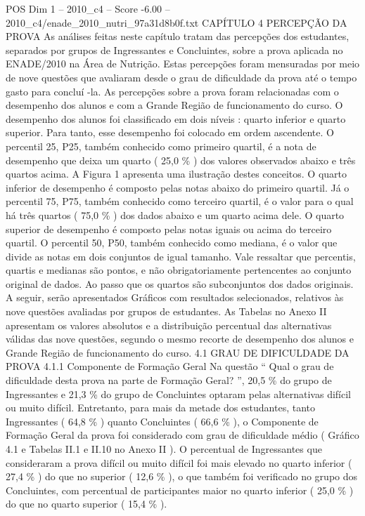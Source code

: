 \begin{textsample}{POS Dim 1 – 2010\_c4 – Score -6.00 – 2010\_c4/enade\_2010\_nutri\_97a31d8b0f.txt}  \label{ex:f1_pos_406}
CAPÍTULO 4 PERCEPÇÃO DA PROVA As análises feitas neste capítulo tratam das percepções dos estudantes, separados por grupos de Ingressantes e Concluintes, sobre a prova aplicada no ENADE/2010 na Área de Nutrição.
Estas percepções foram mensuradas por meio de nove questões que avaliaram desde o grau de dificuldade da prova até o tempo gasto para concluí -la.
As percepções sobre a prova foram relacionadas com o desempenho dos alunos e com a Grande Região de funcionamento do curso.
O desempenho dos alunos foi classificado em dois níveis : quarto inferior e quarto superior.
Para tanto, esse desempenho foi colocado em ordem ascendente.
O percentil 25, P25, também conhecido como primeiro quartil, é a nota de desempenho que deixa um quarto ( 25,0 \% ) dos valores observados abaixo e três quartos acima.
A Figura 1 apresenta uma ilustração destes conceitos.
O quarto inferior de desempenho é composto pelas notas abaixo do primeiro quartil.
Já o percentil 75, P75, também conhecido como terceiro quartil, é o valor para o qual há três quartos ( 75,0 \% ) dos dados abaixo e um quarto acima dele.
O quarto superior de desempenho é composto pelas notas iguais ou acima do terceiro quartil.
O percentil 50, P50, também conhecido como mediana, é o valor que divide as notas em dois conjuntos de igual tamanho.
Vale ressaltar que percentis, quartis e medianas são pontos, e não obrigatoriamente pertencentes ao conjunto original de dados.
Ao passo que os quartos são subconjuntos dos dados originais.
A seguir, serão apresentados Gráficos com resultados selecionados, relativos às nove questões avaliadas por grupos de estudantes.
As Tabelas no Anexo II apresentam os valores absolutos e a distribuição percentual das alternativas válidas das nove questões, segundo o mesmo recorte de desempenho dos alunos e Grande Região de funcionamento do curso. 4.1 GRAU DE DIFICULDADE DA PROVA 4.1.1 Componente de Formação Geral Na questão “ Qual o grau de dificuldade desta prova na parte de Formação Geral? ”, 20,5 \% do grupo de Ingressantes e 21,3 \% do grupo de Concluintes optaram pelas alternativas difícil ou muito difícil.
Entretanto, para mais da metade dos estudantes, tanto Ingressantes ( 64,8 \% ) quanto Concluintes ( 66,6 \% ), o Componente de Formação Geral da prova foi considerado com grau de dificuldade médio ( Gráfico 4.1 e Tabelas II.1 e II.10 no Anexo II ).
O percentual de Ingressantes que consideraram a prova difícil ou muito difícil foi mais elevado no quarto inferior ( 27,4 \% ) do que no superior ( 12,6 \% ), o que também foi verificado no grupo dos Concluintes, com percentual de participantes maior no quarto inferior ( 25,0 \% ) do que no quarto superior ( 15,4 \% ).

\end{textsample}
